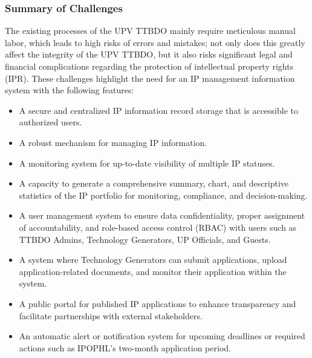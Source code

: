 \subsubsection{Summary of Challenges}

The existing processes of the UPV TTBDO mainly require meticulous manual labor, which leads to high risks of errors and mistakes; not only does this greatly affect the integrity of the UPV TTBDO, but it also risks significant legal and financial complications regarding the protection of intellectual property rights (IPR). These challenges highlight the need for an IP management information system with the following features:

\begin{itemize}
  \item A secure and centralized IP information record storage that is accessible to authorized users.
  \item A robust mechanism for managing IP information.
  \item A monitoring system for up-to-date visibility of multiple IP statuses.
  \item A capacity to generate a comprehensive summary, chart, and descriptive statistics of the IP portfolio for monitoring, compliance, and decision-making.
  \item A user management system to ensure data confidentiality, proper assignment of accountability, and role-based access control (RBAC) with users such as TTBDO Admins, Technology Generators, UP Officials, and Guests.
  \item A system where Technology Generators can submit applications, upload application-related documents, and monitor their application within the system.
  \item A public portal for published IP applications to enhance transparency and facilitate partnerships with external stakeholders.
  \item An automatic alert or notification system for upcoming deadlines or required actions such as IPOPHL’s two-month application period.
\end{itemize}

